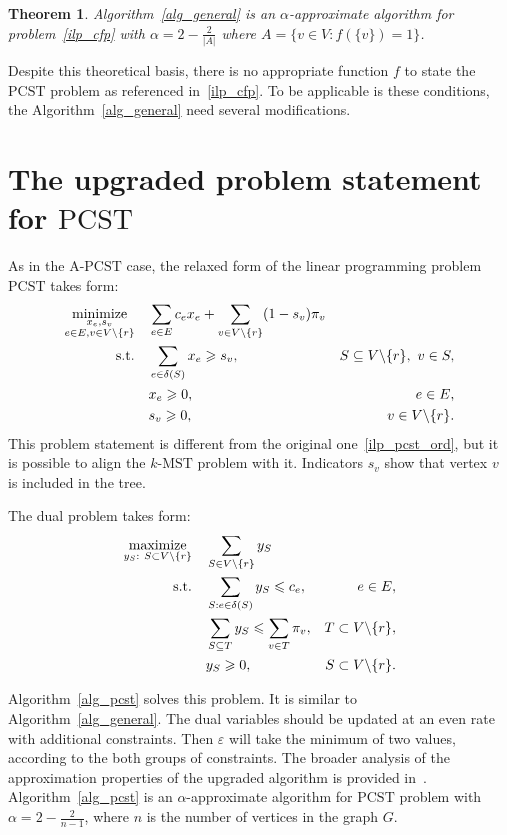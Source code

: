 \documentclass[12pt]{article}
\newtheorem{theorem}{Theorem}
\begin{document}
\begin{theorem}
  Algorithm~\ref{alg_general} is an $\alpha$-approximate algorithm for problem~\eqref{ilp_cfp} with $\alpha = 2 - \frac{2}{|A|}$ where $A=\{v\in V: f(\{v\})=1\}$.
  \label{theorem2}
\end{theorem}
Despite this theoretical basis, there is no appropriate function $f$ to state the $\text{PCST}$ problem as referenced in~\eqref{ilp_cfp}. To be applicable is these conditions, the Algorithm~\ref{alg_general} need several modifications.


\section{The upgraded problem statement for $\text{PCST}$}


As in the $\text{A}$-$\text{PCST}$ case, the relaxed form of the linear programming problem $\text{PCST}$ takes form:
\begin{align}
\underset{\substack{x_e,s_v \\ e\in E, v\in V\backslash \{r\}}}{\text{minimize}}\quad & \sum\limits_{e\in E}c_ex_e + \sum\limits_{v\in V\backslash\{r\}}(1-s_v)\pi_v \nonumber\\
\text{s.t.\quad} & \sum\limits_{e\in\delta(S)}x_e\geqslant s_v, & S\subseteq V\backslash \{r\},~v\in S,\label{rlp_pcst_inord}\\
& x_e\geqslant 0, & e\in E,\nonumber\\
& s_v\geqslant 0, & v\in V\backslash \{r\}.\nonumber
\end{align}
This problem statement is different from the original one~\eqref{ilp_pcst_ord}, but it is possible to align the $k\text{-MST}$ problem with it. Indicators $s_v$ show that vertex $v$ is included in the tree.


The dual problem takes form:
\begin{align}
\underset{\substack{y_S:~S\subset V\backslash\{r\}}}{\text{maximize}}\quad & \sum\limits_{S\in V\backslash\{r\}}y_S \nonumber\\
\text{s.t.\quad} & \sum\limits_{S:e\in\delta(S)}y_S\leqslant c_e , & e\in E,\label{rd_pcst_inord}\\
& \sum\limits_{S\subseteq T}y_S\leqslant \sum\limits_{v\in T}\pi_v, & T\subset V\backslash\{r\},\nonumber\\
& y_S\geqslant 0, & S\subset V\backslash\{r\}.\nonumber
\end{align}


Algorithm~\ref{alg_pcst} solves this problem. It is similar to Algorithm~\ref{alg_general}. The dual variables should be updated at an even rate with additional constraints. Then $\varepsilon$ will take the minimum of two values, according to the both groups of constraints.
The broader analysis of the approximation properties of the upgraded algorithm is provided in~\cite{goemans1995general}. Algorithm~\ref{alg_pcst} is an $\alpha$-approximate algorithm for $\text{PCST}$ problem with $\alpha = 2 - \frac{2}{n-1}$, where $n$ is the number of vertices in the graph $G$.
\end{document}

